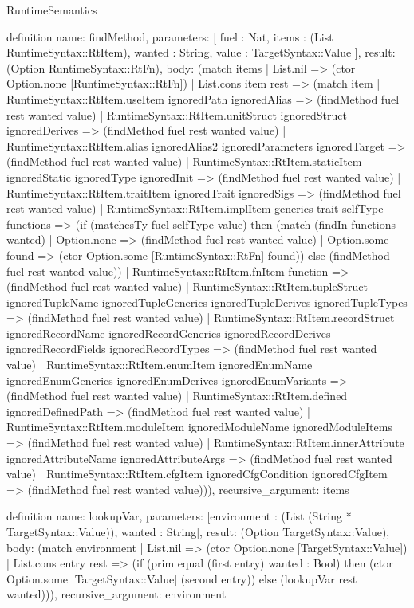 \begin{lexlean}{RuntimeSemantics}
\begin{semanticmodule}
definition{
  name: findMethod,
  parameters: [
    fuel : Nat,
    items : (List RuntimeSyntax::RtItem),
    wanted : String,
    value : TargetSyntax::Value
  ],
  result: (Option RuntimeSyntax::RtFn),
  body: (match items
    | List.nil => (ctor Option.none [RuntimeSyntax::RtFn])
    | List.cons item rest => (match item
      | RuntimeSyntax::RtItem.useItem ignoredPath ignoredAlias => (findMethod fuel rest wanted value)
      | RuntimeSyntax::RtItem.unitStruct ignoredStruct ignoredDerives => (findMethod fuel rest wanted value)
      | RuntimeSyntax::RtItem.alias ignoredAlias2 ignoredParameters ignoredTarget => (findMethod fuel rest wanted value)
      | RuntimeSyntax::RtItem.staticItem ignoredStatic ignoredType ignoredInit => (findMethod fuel rest wanted value)
      | RuntimeSyntax::RtItem.traitItem ignoredTrait ignoredSigs => (findMethod fuel rest wanted value)
      | RuntimeSyntax::RtItem.implItem generics trait selfType functions => (if (matchesTy fuel selfType value) then (match (findIn functions wanted)
        | Option.none => (findMethod fuel rest wanted value)
        | Option.some found => (ctor Option.some [RuntimeSyntax::RtFn] found)) else (findMethod fuel rest wanted value))
      | RuntimeSyntax::RtItem.fnItem function => (findMethod fuel rest wanted value)
      | RuntimeSyntax::RtItem.tupleStruct ignoredTupleName ignoredTupleGenerics ignoredTupleDerives ignoredTupleTypes => (findMethod fuel rest wanted value)
      | RuntimeSyntax::RtItem.recordStruct ignoredRecordName ignoredRecordGenerics ignoredRecordDerives ignoredRecordFields ignoredRecordTypes => (findMethod fuel rest wanted value)
      | RuntimeSyntax::RtItem.enumItem ignoredEnumName ignoredEnumGenerics ignoredEnumDerives ignoredEnumVariants => (findMethod fuel rest wanted value)
      | RuntimeSyntax::RtItem.defined ignoredDefinedPath => (findMethod fuel rest wanted value)
      | RuntimeSyntax::RtItem.moduleItem ignoredModuleName ignoredModuleItems => (findMethod fuel rest wanted value)
      | RuntimeSyntax::RtItem.innerAttribute ignoredAttributeName ignoredAttributeArgs => (findMethod fuel rest wanted value)
      | RuntimeSyntax::RtItem.cfgItem ignoredCfgCondition ignoredCfgItem => (findMethod fuel rest wanted value))),
  recursive_argument: items
}

definition{
  name: lookupVar,
  parameters: [environment : (List (String * TargetSyntax::Value)), wanted : String],
  result: (Option TargetSyntax::Value),
  body: (match environment
    | List.nil => (ctor Option.none [TargetSyntax::Value])
    | List.cons entry rest => (if (prim equal (first entry) wanted : Bool) then (ctor Option.some [TargetSyntax::Value] (second entry)) else (lookupVar rest wanted))),
  recursive_argument: environment
}


\end{semanticmodule}
\end{lexlean}
